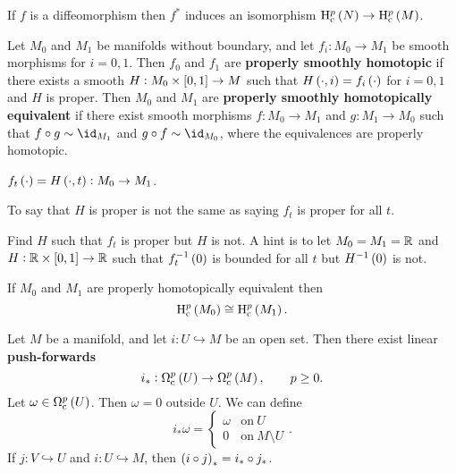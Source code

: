 \begin{exercise*}
If $ f $ is a diffeomorphism then $ f^* $ induces an isomorphism $ \H_\c^p\br{N} \to \H_\c^p\br{M} $.
\end{exercise*}


\begin{definition}
Let $ M_0 $ and $ M_1 $ be manifolds without boundary, and let $ f_i : M_0 \to M_1 $ be smooth morphisms for $ i = 0, 1 $. Then $ f_0 $ and $ f_1 $ are \textbf{properly smoothly homotopic} if there exists a smooth $ H : M_0 \times \sbr{0, 1} \to M $ such that $ H\br{\cdot, i} = f_i\br{\cdot} $ for $ i = 0, 1 $ and $ H $ is proper. Then $ M_0 $ and $ M_1 $ are \textbf{properly smoothly homotopically equivalent} if there exist smooth morphisms $ f : M_0 \to M_1 $ and $ g : M_1 \to M_0 $ such that $ f \circ g \sim \id_{M_1} $ and $ g \circ f \sim \id_{M_0} $, where the equivalences are properly homotopic.
\end{definition}

\begin{notation*}
$ f_t\br{\cdot} = H\br{\cdot, t} : M_0 \to M_1 $.
\end{notation*}

\begin{remark}
To say that $ H $ is proper is not the same as saying $ f_t $ is proper for all $ t $.
\end{remark}

\begin{exercise*}
Find $ H $ such that $ f_t $ is proper but $ H $ is not. A hint is to let $ M_0 = M_1 = \mathbb{R} $ and $ H : \RR \times \sbr{0, 1} \to \RR $ such that $ f_t^{-1}\br{0} $ is bounded for all $ t $ but $ H^{-1}\br{0} $ is not.
\end{exercise*}

\begin{proposition}
If $ M_0 $ and $ M_1 $ are properly homotopically equivalent then
$$ \H_\c^p\br{M_0} \cong \H_\c^p\br{M_1}. $$
\end{proposition}

Let $ M $ be a manifold, and let $ i : U \hookrightarrow M $ be an open set. Then there exist linear \textbf{push-forwards}
$$ i_* : \Omega_\c^p\br{U} \to \Omega_\c^p\br{M}, \qquad p \ge 0. $$
Let $ \omega \in \Omega_\c^p\br{U} $. Then $ \omega = 0 $ outside $ U $. We can define
$$ i_*\omega =
\begin{cases}
\omega & \text{on} \ U \\
0 & \text{on} \ M \setminus U
\end{cases}.
$$
If $ j : V \hookrightarrow U $ and $ i : U \hookrightarrow M $, then $ \br{i \circ j}_* = i_* \circ j_* $.

